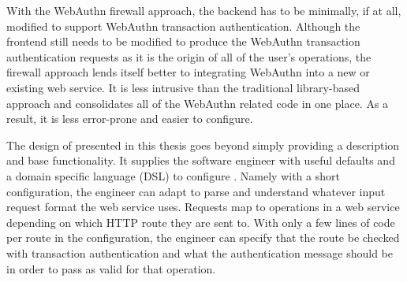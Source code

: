 With the WebAuthn firewall approach, the backend has to be minimally, if at all, modified to support WebAuthn transaction authentication. Although the frontend still needs to be modified to produce the WebAuthn transaction authentication requests as it is the origin of all of the user's operations, the firewall approach lends itself better to integrating WebAuthn into a new or existing web service. It is less intrusive than the traditional library-based approach and consolidates all of the WebAuthn related code in one place. As a result, it is less error-prone and easier to configure. 




The design of \sys{} presented in this thesis goes beyond simply providing a description and base functionality. It supplies the software engineer with useful defaults and a domain specific language (DSL) to configure \sys{}. Namely with a short configuration, the engineer can adapt \sys{} to parse and understand whatever input request format the web service uses. Requests map to operations in a web service depending on which HTTP route they are sent to. With only a few lines of code per route in the \sys{} configuration, the engineer can specify that the route be checked with transaction authentication and what the authentication message should be in order to pass as valid for that operation. 




